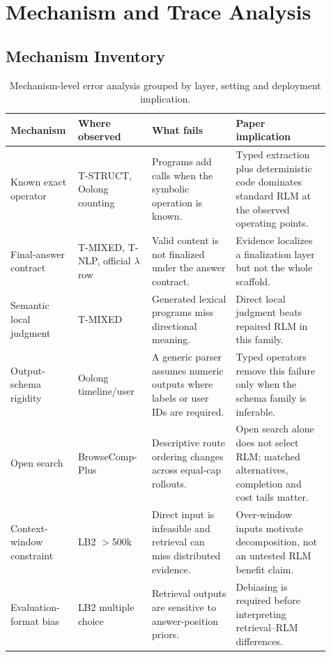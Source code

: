 \FloatBarrier
\section{Mechanism and Trace Analysis}

\subsection{Mechanism Inventory}
\label{app:mechanisms}

\begin{table}[!htbp]
\caption{Mechanism-level error analysis grouped by layer, setting and deployment implication.}
\label{tab:appendix-mechanisms}
\centering
\footnotesize
\setlength{\tabcolsep}{3pt}
\begin{tabular}{@{}p{0.15\linewidth}p{0.22\linewidth}p{0.25\linewidth}p{0.29\linewidth}@{}}
\toprule
\textbf{Mechanism} & \textbf{Where observed} & \textbf{What fails} & \textbf{Paper implication} \\
\midrule
Known exact operator & T-STRUCT, Oolong counting & Programs add calls when the symbolic operation is known. & Typed extraction plus deterministic code dominates standard RLM at the observed operating points. \\
Final-answer contract & T-MIXED, T-NLP, official $\lambda$ row & Valid content is not finalized under the answer contract. & Evidence localizes a finalization layer but not the whole scaffold. \\
Semantic local judgment & T-MIXED & Generated lexical programs miss directional meaning. & Direct local judgment beats repaired RLM in this family. \\
Output-schema rigidity & Oolong timeline/user & A generic parser assumes numeric outputs where labels or user IDs are required. & Typed operators remove this failure only when the schema family is inferable. \\
Open search & BrowseComp-Plus & Descriptive route ordering changes across equal-cap rollouts. & Open search alone does not select RLM; matched alternatives, completion and cost tails matter. \\
Context-window constraint & LB2 $>$500k & Direct input is infeasible and retrieval can miss distributed evidence. & Over-window inputs motivate decomposition, not an untested RLM benefit claim. \\
Evaluation-format bias & LB2 multiple choice & Retrieval outputs are sensitive to answer-position priors. & Debiasing is required before interpreting retrieval--RLM differences. \\
\bottomrule
\end{tabular}
\end{table}

